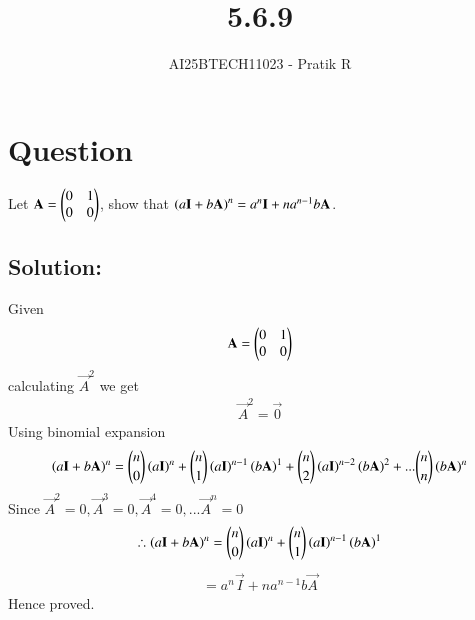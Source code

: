 \documentclass[journal]{IEEEtran}
\begin{document}

\vspace{3cm}

\title{5.6.9}
\author{AI25BTECH11023 - Pratik R}
{\let\newpage\relax\maketitle}

\renewcommand{\thefigure}{\theenumi}
\renewcommand{\thetable}{\theenumi}
\setlength{\intextsep}{10pt} %


\renewcommand{\thetable}{\theenumi}


\section*{\textbf{Question}}
Let $\mathbf{A}= \begin{pmatrix}0&1\\0&0\end{pmatrix}$, show that $\left(a\mathbf{I} + b\mathbf{A}\right)^n = a^n\mathbf{I} + na^{n-1}b\mathbf{A}$.

\subsection*{\textbf{Solution:}} 
Given
\begin{align}
  \mathbf{A}= \begin{pmatrix}0&1\\0&0\end{pmatrix}
\end{align}
calculating $\vec{A}^2$ we get 
\begin{align}
   \vec{A}^2 = \vec{0}
\end{align}
Using binomial expansion
\begin{align}
\left(a\mathbf{I} + b\mathbf{A}\right)^n = {n\choose 0}\left(a\mathbf{I}\right)^n + {n\choose 1}\left(a\mathbf{I}\right)^{n-1}\left(b\mathbf{A}\right)^{1} + {n\choose 2}\left(a\mathbf{I}\right)^{n-2}\left(b\mathbf{A}\right)^{2} +... {n\choose n}\left(b\mathbf{A}\right)^{n}
\end{align}
Since $\vec{A}^2 =0, \vec{A}^3 =0, \vec{A}^4=0,...\vec{A}^n =0$
\begin{align}
   \therefore \left(a\mathbf{I} + b\mathbf{A}\right)^n = {n\choose 0}\left(a\mathbf{I}\right)^n + {n\choose 1}\left(a\mathbf{I}\right)^{n-1}\left(b\mathbf{A}\right)^{1}
\end{align}
\begin{align}
   = a^n\vec{I} + na^{n-1}b\vec{A}
\end{align}
Hence proved.
\end{document}
